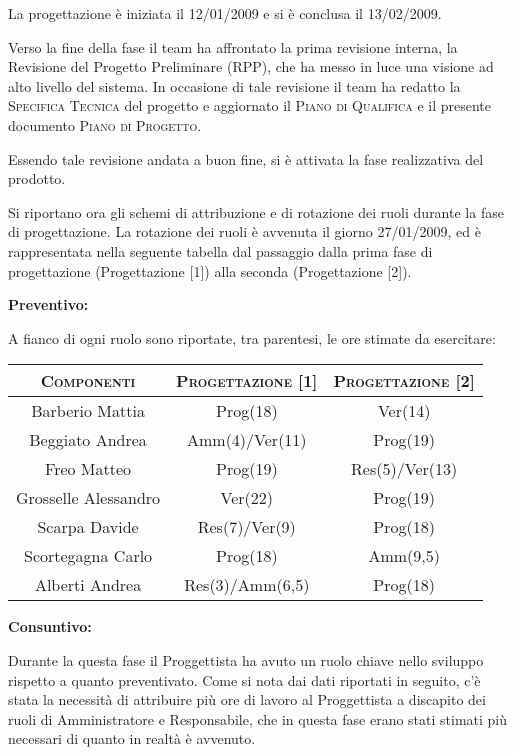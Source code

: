 \documentclass[11pt,a4paper]{article}
\begin{document}
La progettazione è iniziata il 12/01/2009 e si è conclusa il 13/02/2009.

Verso la fine della fase il team ha affrontato la prima revisione interna, la Revisione del Progetto Preliminare (RPP), che ha messo in luce una visione ad alto livello del sistema.
In occasione di tale revisione il team ha redatto la \textsc{Specifica Tecnica} del progetto e aggiornato il \textsc{Piano di Qualifica} e il presente documento \textsc{Piano di Progetto}.

Essendo tale revisione andata a buon fine, si è attivata la fase realizzativa del prodotto.

Si riportano ora gli schemi di attribuzione e di rotazione dei ruoli durante la fase di progettazione.
La rotazione dei ruoli è avvenuta il giorno 27/01/2009, ed è rappresentata nella seguente tabella dal passaggio dalla prima fase di progettazione (Progettazione [1]) alla seconda (Progettazione [2]).

\bigskip \bigskip 
\begin{large}\textbf{Preventivo:}\end{large}
\newline
A fianco di ogni ruolo sono riportate, tra parentesi, le ore stimate da esercitare:
\\
\begin{center}
\begin{tabular}{|c||c|c|}
\hline
\textsc{Componenti} & \textsc{Progettazione [1]} & \textsc{Progettazione [2]} \\ \hline \hline
Barberio Mattia & Prog(18) & Ver(14) \\ \hline
Beggiato Andrea & Amm(4)/Ver(11) & Prog(19) \\ \hline
Freo Matteo & Prog(19) & Res(5)/Ver(13) \\ \hline
Grosselle Alessandro & Ver(22) & Prog(19) \\ \hline
Scarpa Davide & Res(7)/Ver(9) & Prog(18) \\ \hline
Scortegagna Carlo & Prog(18) & Amm(9,5) \\ \hline
Alberti Andrea & Res(3)/Amm(6,5) & Prog(18) \\ \hline
\end{tabular}
\end{center}

\bigskip \bigskip 
\begin{large}\textbf{Consuntivo:}\end{large}
\newline
Durante la questa fase il Proggettista ha avuto un ruolo chiave nello sviluppo rispetto a quanto preventivato. Come si nota dai dati riportati in seguito, c'è stata la necessità di attribuire più ore di lavoro al Proggettista a discapito dei ruoli di Amministratore e Responsabile, che in questa fase erano stati stimati più necessari di quanto in realtà è avvenuto.
\end{document}
